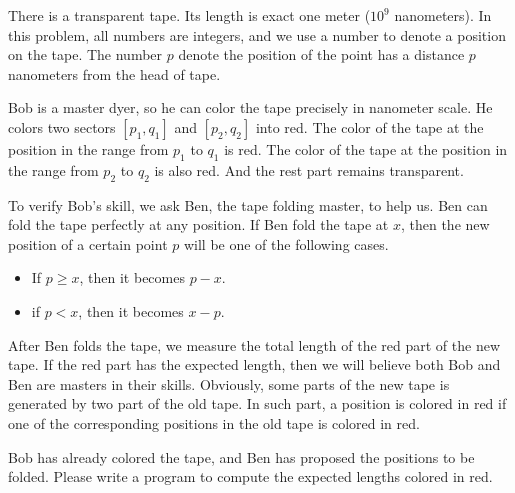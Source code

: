 There is a transparent tape. Its length is exact one meter ($10^9$ nanometers).
In this problem, all numbers are integers, and we use a number to denote 
a position on the tape. The number $p$ denote the position of the point
has a distance $p$ nanometers from the head of tape.

Bob is a master dyer, so he can color the tape precisely in nanometer scale.
He colors two sectors $[p_1,q_1]$ and $[p_2,q_2]$ into red. 
The color of the tape at the position in the range from $p_1$ to
$q_1$ is red. 
The color of the tape at the position in the range from $p_2$ to $q_2$
is also red. And the rest part remains transparent. 

To verify Bob's skill, we ask Ben, the tape folding master, to help us.
Ben can fold the tape perfectly at any position. 
If Ben fold the tape at $x$, then the new position of a certain point $p$ 
will be one of the following cases.
\begin{itemize}
\tightlist
\item If $p\ge x$, then it becomes $p-x$.
\item if $p<x$, then it becomes $x-p$. 
\end{itemize}
After Ben folds the tape, we measure the total length of the red part of the
new tape. 
If the red part has the expected length, then we will believe both Bob and Ben
are masters in their skills.
Obviously, some parts of the new tape is generated by two part of the old tape. 
In such part, a position is colored in red if one of the corresponding 
positions in the old tape is colored in red. 

Bob has already colored the tape, and Ben has proposed the positions to be
folded. 
Please write a program to compute the expected lengths colored in red.
